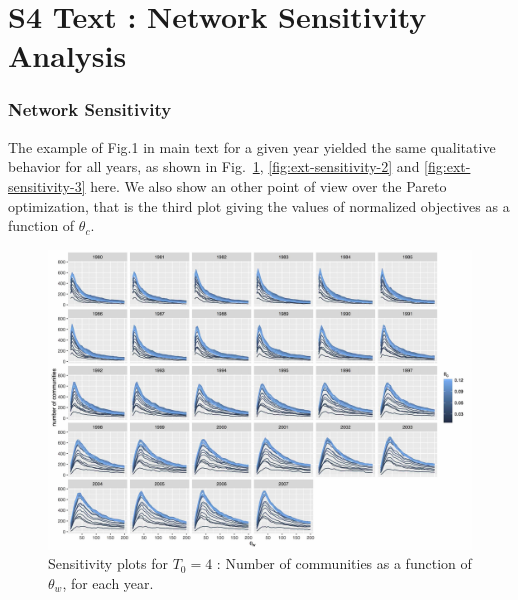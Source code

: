 \documentclass[12pt,twoside,a4paper]{article}
\begin{document}
\section*{S4 Text : Network Sensitivity Analysis \label{app:sensitivity}}


\subsubsection*{Network Sensitivity}

The example of Fig.1 in main text for a given year yielded the same qualitative behavior for all years, as shown in Fig.~\ref{fig:ext-sensitivity-1}, \ref{fig:ext-sensitivity-2} and \ref{fig:ext-sensitivity-3} here.  We also show an other point of view over the Pareto optimization, that is the third plot giving the values of normalized objectives as a function of $\theta_c$.


\begin{figure}
\centering
\includegraphics[width=\textheight,height=\textwidth,angle=90]{commnum_thetaw_byyears.jpg}
\caption{Sensitivity plots for $T_0 = 4$ : Number of communities as a function of $\theta_w$, for each year.}
\label{fig:ext-sensitivity-1}
\end{figure}
\end{document}
